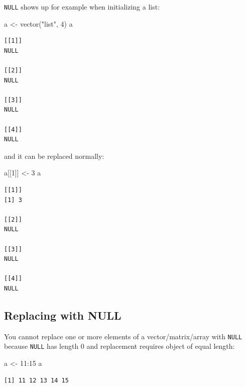 \documentclass[
]{book}
\newenvironment{Shaded}{\begin{snugshade}}{\end{snugshade}}
\newcommand{\DecValTok}[1]{\textcolor[rgb]{0.00,0.00,0.81}{#1}}
\newcommand{\FunctionTok}[1]{\textcolor[rgb]{0.00,0.00,0.00}{#1}}
\newcommand{\NormalTok}[1]{#1}
\newcommand{\OtherTok}[1]{\textcolor[rgb]{0.56,0.35,0.01}{#1}}
\newcommand{\SpecialCharTok}[1]{\textcolor[rgb]{0.00,0.00,0.00}{#1}}
\newcommand{\StringTok}[1]{\textcolor[rgb]{0.31,0.60,0.02}{#1}}
\begin{document}
\texttt{NULL} shows up for example when initializing a list:

\begin{Shaded}
\begin{Highlighting}[]
\NormalTok{a }\OtherTok{\textless{}{-}} \FunctionTok{vector}\NormalTok{(}\StringTok{"list"}\NormalTok{, }\DecValTok{4}\NormalTok{)}
\NormalTok{a}
\end{Highlighting}
\end{Shaded}

\begin{verbatim}
[[1]]
NULL

[[2]]
NULL

[[3]]
NULL

[[4]]
NULL
\end{verbatim}

and it can be replaced normally:

\begin{Shaded}
\begin{Highlighting}[]
\NormalTok{a[[}\DecValTok{1}\NormalTok{]] }\OtherTok{\textless{}{-}} \DecValTok{3}
\NormalTok{a}
\end{Highlighting}
\end{Shaded}

\begin{verbatim}
[[1]]
[1] 3

[[2]]
NULL

[[3]]
NULL

[[4]]
NULL
\end{verbatim}

\hypertarget{replacing-with-null}{%
\subsection{Replacing with NULL}\label{replacing-with-null}}

You cannot replace one or more elements of a vector/matrix/array with \texttt{NULL} because \texttt{NULL} has length 0 and replacement requires object of equal length:

\begin{Shaded}
\begin{Highlighting}[]
\NormalTok{a }\OtherTok{\textless{}{-}} \DecValTok{11}\SpecialCharTok{:}\DecValTok{15}
\NormalTok{a}
\end{Highlighting}
\end{Shaded}

\begin{verbatim}
[1] 11 12 13 14 15
\end{verbatim}
\end{document}
